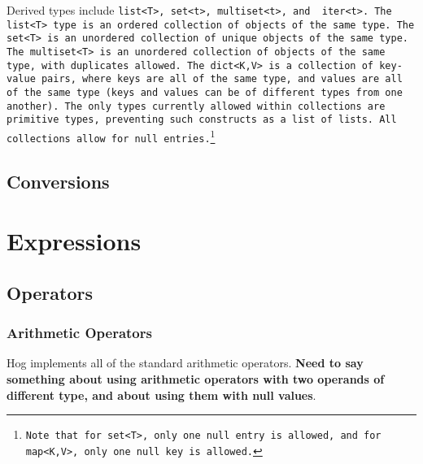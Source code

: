 \documentclass{book}
\begin{document}
Derived types include \tt list<T>\rm, \tt set<t>\rm, \tt multiset<t>\rm, and \tt
iter<t>\rm. The \tt list<T> \rm type is an ordered collection of objects of the
same type. The \tt set<T> \rm is an unordered collection of unique objects of the
same type. The \tt multiset<T> \rm is an unordered collection of objects of the
same type, with duplicates allowed. The \tt dict<K,V> \rm is a collection of
key­value pairs, where keys are all of the same type, and values are all of the
same type (keys and values can be of different types from one another). The only
types currently allowed within collections are primitive types, preventing such
constructs as a list of lists. All collections allow for null
entries.\footnote{Note that for \tt set<T>\rm, only one \tt null \rm entry is
allowed, and for \tt map<K,V>\rm, only one \tt null \rm key is allowed.}


\section{Conversions} %
\label{sec:conversions}



\chapter{Expressions} %
\label{cha:expressions}

\section{Operators} %
\label{sec:operators}

\subsection{Arithmetic Operators} %
\label{sub:arithmetic_operators}

Hog implements all of the standard arithmetic operators. \textbf{Need to say
something about using arithmetic operators with two operands of different type, and
about using them with null values}.
\end{document}
